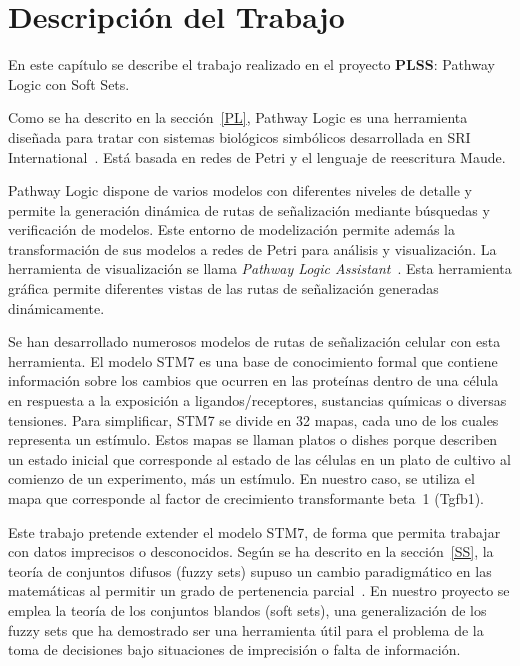 
\chapter{Descripción del Trabajo}
\label{cap:descripcionTrabajo}

En este capítulo se describe el trabajo realizado en el proyecto \textbf{PLSS}: Pathway Logic con Soft Sets.
\smallskip

Como se ha descrito en la sección~\ref{PL}, Pathway Logic es una herramienta diseñada para tratar con sistemas biológicos simbólicos desarrollada en SRI International~\citep{sfm/Talcott08}. Está basada en redes de Petri y el lenguaje de reescritura Maude.
\smallskip

Pathway Logic dispone de varios modelos con diferentes niveles de detalle y permite la generación dinámica de rutas de señalización mediante búsquedas y verificación de modelos.
Este entorno de modelización permite además la transformación de sus modelos a redes de Petri para análisis y visualización.
La herramienta de visualización se llama \textit{Pathway Logic Assistant}~\citep{talcott-dill-05cmsb}.
Esta herramienta gráfica permite diferentes vistas de las rutas de señalización generadas dinámicamente.
\medskip

Se han desarrollado numerosos modelos de rutas de señalización celular con esta herramienta. 
El modelo STM7 es una base de conocimiento formal que contiene información sobre los cambios que ocurren en las proteínas dentro de una célula en respuesta a la exposición a ligandos/receptores, sustancias químicas o diversas tensiones. 
Para simplificar, STM7 se divide en 32 mapas, cada uno de los cuales representa un estímulo.
Estos mapas se llaman platos o dishes porque describen un estado inicial que corresponde al estado de las células en un plato de cultivo al comienzo de un experimento, más un estímulo.
En nuestro caso, se utiliza el mapa que corresponde al factor de crecimiento transformante beta~1 (Tgfb1).
\medskip


Este trabajo pretende extender el modelo STM7, de forma que permita trabajar con datos imprecisos o desconocidos.
Según se ha descrito en la sección~\ref{SS}, la teoría de conjuntos difusos (fuzzy sets) supuso un cambio paradigmático en las matemáticas al permitir un grado de pertenencia parcial~\citep{Zadeh}. 
En nuestro proyecto se emplea la teoría de los conjuntos blandos (soft sets), una generalización de los fuzzy sets que ha demostrado ser una herramienta útil para el problema de la toma de decisiones bajo situaciones de imprecisión o falta de información.
\medskip


